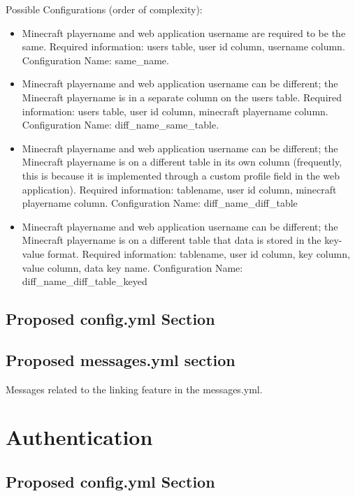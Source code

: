 \documentclass[letterpaper,12pt]{article}
\begin{document}
  Possible Configurations (order of complexity):
  \begin{itemize}
    \item Minecraft playername and web application username are required to be
      the same. Required information: users table, user id column, username
      column. Configuration Name: same\_name.
    \item Minecraft playername and web application username can be different;
      the Minecraft playername is in a separate column on the users table.
      Required information: users table, user id column, minecraft playername
      column. Configuration Name: diff\_name\_same\_table.
    \item Minecraft playername and web application username can be different;
      the Minecraft playername is on a different table in its own column
      (frequently, this is because it is implemented through a custom profile
      field in the web application). Required information: tablename, user id
      column, minecraft playername column.
      Configuration Name: diff\_name\_diff\_table
    \item Minecraft playername and web application username can be different;
      the Minecraft playername is on a different table that data is stored in
      the key-value format. Required information: tablename, user id column,
      key column, value column, data key name.
      Configuration Name: diff\_name\_diff\_table\_keyed
  \end{itemize}
  \clearpage
  
  \subsection{Proposed config.yml Section}
  
  
  \subsection{Proposed messages.yml section}
  Messages related to the linking feature in the messages.yml.
  

  \clearpage
  \section{Authentication}
  \subsection{Proposed config.yml Section}
  
  \clearpage
\end{document}
